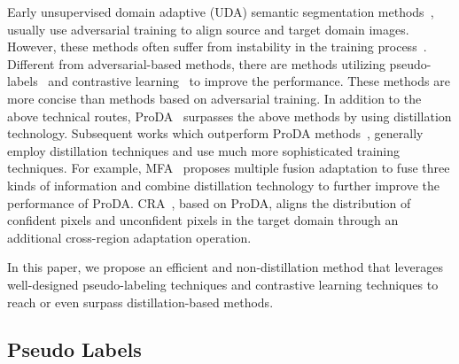 \documentclass[sigconf]{acmart}
\begin{document}
		Early unsupervised domain adaptive (UDA) semantic segmentation methods~\cite{hoffman2018cycada,huang2020contextual,tsai2018learning,wang2020differential,yang2020fda,zhang2020joint}, usually use adversarial training to align source and target domain images.
		However, these methods often suffer from instability in the training process~\cite{chen2020adversarial,gulrajani2017improved}. Different from adversarial-based methods, there are methods utilizing pseudo-labels~\cite{tranheden2021dacs,melas2021pixmatch,zhou2021domain} and contrastive learning~\cite{zhou2021domain,xie2021spcl} to improve the performance. These methods are more concise than methods based on adversarial training.
		In addition to the above technical routes, ProDA~\cite{zhang2021prototypical} surpasses the above methods by using distillation technology. Subsequent works which outperform ProDA methods~\cite{zhang2021multiple,wang2021cross,huang2021category}, generally employ distillation techniques and use much more sophisticated training techniques. For example, MFA~\cite{zhang2021multiple} proposes multiple fusion adaptation to fuse three kinds of information and combine distillation technology to further improve the performance of ProDA. CRA~\cite{wang2021cross}, based on ProDA, aligns the distribution of confident pixels and unconfident pixels in the target domain through an additional cross-region adaptation operation.
		
		In this paper, we propose an efficient and non-distillation method that leverages well-designed pseudo-labeling techniques and contrastive learning techniques to reach or even surpass distillation-based methods.
		
		
		\subsection{Pseudo Labels}
		
\end{document}
